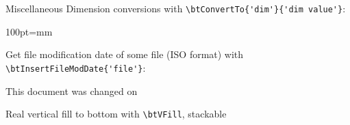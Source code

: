 \documentclass{beamer}
\begin{document}
\begin{frame}[fragile]{Miscellaneous}
\bi
\ii Dimension conversions with \lstinline|\btConvertTo{'dim'}{'dim value'}|:
\par
\begin{LTXexample}[pos=r]
100pt=mm
\end{LTXexample}
\ii Get file modification date of some file (ISO format) with \lstinline|\btInsertFileModDate{'file'}|:
\par
\begin{LTXexample}[pos=r]
This document was changed on 
\end{LTXexample}
\ii Real vertical fill to bottom with \lstinline|\btVFill|, stackable
\begin{LTXexample}[pos=r]
\btVFill
{}
\end{LTXexample}
\btVFill
{}
\ei
  
\end{frame}
\end{document}
